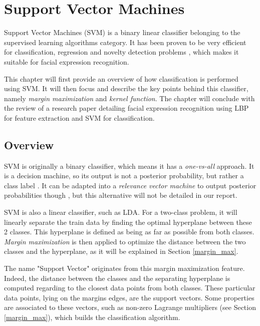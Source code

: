 \chapter{Support Vector Machines}
\label{chap:svm}

\noindent Support Vector Machines (SVM) is a binary linear classifier belonging to the supervised learning algorithms category. It has been proven to be very efficient for classification, regression and novelty detection problems \cite{BIS06}, which makes it suitable for facial expression recognition.
\newline

\noindent This chapter will first provide an overview of how classification is performed using SVM. It will then focus and describe the key points behind this classifier, namely \textit{margin maximization} and \textit{kernel function}. The chapter will conclude with the review of a research paper detailing facial expression recognition using LBP for feature extraction and SVM for classification.
\newline

\section{Overview}
\label{svm_overview}

\vspace{\baselineskip}
\noindent SVM is originally a binary classifier, which means it has a \textit{one-vs-all} approach. It is a decision machine, so its output is not a posterior probability, but rather a class label \cite{BIS06}.  It can be adapted into a \textit{relevance vector machine} to output posterior probabilities though \cite{BIS06}, but this alternative will not be detailed in our report.
\newline

\noindent SVM is also a linear classifier, such as LDA. For a two-class problem, it will linearly separate the train data by finding the optimal hyperplane between these 2 classes. This hyperplane is defined as being as far as possible from both classes. \textit{Margin maximization} is then applied to optimize the distance between the two classes and the hyperplane, as it will be explained in Section \ref{margin_max}.
\newline

\noindent The name "Support Vector" originates from this margin maximization feature. Indeed, the distance between the classes and the separating hyperplane is computed regarding to the closest data points from both classes. These particular data points, lying on the margins edges, are the support vectors. Some properties are associated to these vectors, such as non-zero Lagrange multipliers (see Section \ref{margin_max}), which builds the classification algorithm.
\newline

